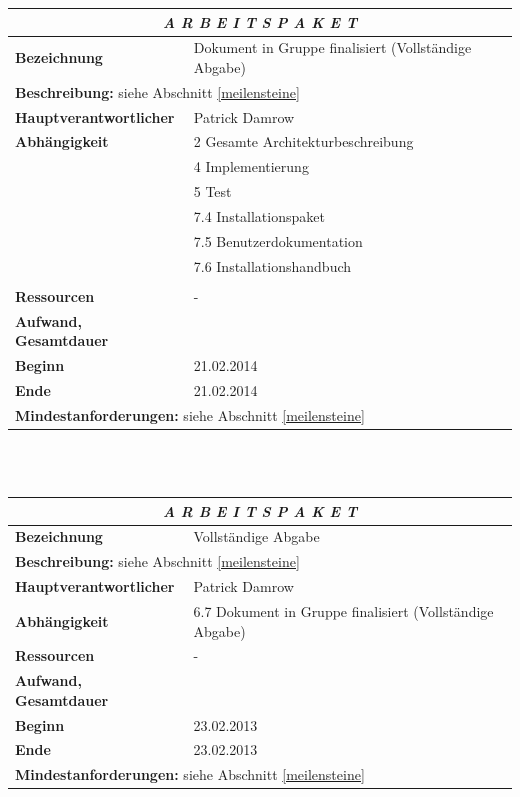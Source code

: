 \documentclass[fontsize=12pt,paper=a4,twoside]{scrartcl}
\begin{document}
\begin{tabular}{p{7.5cm}|p{7.5cm}}\toprule
\multicolumn{2}{c}{\textbf{\textit{A R B E I T S P A K E T \quad 6.7}}} \\ \toprule \hline
\textbf{Bezeichnung} & Dokument in Gruppe finalisiert (Vollständige Abgabe)\\\hline
\multicolumn{2}{p{15cm}}{\textbf{Beschreibung:} \newline 
siehe Abschnitt \ref{meilensteine} }  \\\hline
\textbf{Hauptverantwortlicher} & Patrick Damrow \\\hline
\textbf{Abhängigkeit} & 2 Gesamte Architekturbeschreibung \\
& 4 Implementierung \\
& 5 Test \\
& 7.4 Installationspaket \\
& 7.5 Benutzerdokumentation \\
& 7.6 Installationshandbuch \\
\\\hline
\textbf{Ressourcen} & -\\\hline
\textbf{Aufwand, Gesamtdauer} & \\\hline
\textbf{Beginn} & 21.02.2014 \\\hline
\textbf{Ende} & 21.02.2014\\\hline
\multicolumn{2}{p{15cm}}{\textbf{Mindestanforderungen: } \newline
siehe Abschnitt \ref{meilensteine}}  \\ \toprule
\end{tabular} \\\\

\begin{tabular}{p{7.5cm}|p{7.5cm}}\toprule
\multicolumn{2}{c}{\textbf{\textit{A R B E I T S P A K E T \quad 6.8}}} \\ \toprule \hline
\textbf{Bezeichnung} & Vollständige Abgabe\\\hline
\multicolumn{2}{p{15cm}}{\textbf{Beschreibung:} \newline 
siehe Abschnitt \ref{meilensteine} }  \\\hline
\textbf{Hauptverantwortlicher} & Patrick Damrow \\\hline
\textbf{Abhängigkeit} & 6.7 Dokument in Gruppe finalisiert (Vollständige Abgabe)\\\hline
\textbf{Ressourcen} & -\\\hline
\textbf{Aufwand, Gesamtdauer} & \\\hline
\textbf{Beginn} & 23.02.2013 \\\hline
\textbf{Ende} & 23.02.2013\\\hline
\multicolumn{2}{p{15cm}}{\textbf{Mindestanforderungen: } \newline
siehe Abschnitt \ref{meilensteine}}  \\ \toprule
\end{tabular} \\\\
\end{document}
